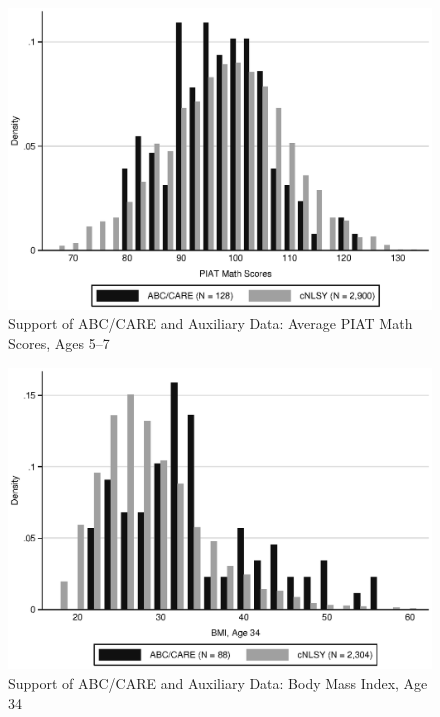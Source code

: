 \documentclass[static]{JJH-Beamer}
\begin{document}
\begin{frame}
 \addtocounter{framenumber}{-1}

\begin{figure}[H]\addtocounter{figure}{-1}
\caption{Support of ABC/CARE and Auxiliary Data: Average PIAT Math Scores, Ages 5--7} \label{fig:support_math}
\begin{center}
\includegraphics[width=.75\textwidth]{AppOutput/Methodology/support_math.eps}
\end{center}
\end{figure}

\end{frame}

\begin{frame}
 \addtocounter{framenumber}{-1}
	
\begin{figure}[H]\addtocounter{figure}{-1}
\caption{Support of ABC/CARE and Auxiliary Data: Body Mass Index, Age 34} \label{fig:support_bmi}
\begin{center}
\includegraphics[width=.75\textwidth]{AppOutput/Methodology/support_bmi.eps}
\end{center}
\end{figure}

\end{frame}
\end{document}
